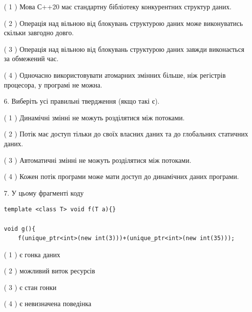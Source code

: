 \documentclass[12pt, ukrainian]{article}
\begin{document}
\begin {large}
{( 1 ) Мова С++20 має стандартну бібліотеку конкурентних структур даних.%

( 2 ) Операція над вільною від блокувань структурою даних може виконуватись скільки завгодно довго.%

( 3 ) Операція над вільною від блокувань структурою даних завжди виконається за обмежений час.%

( 4 ) Одночасно використовувати атомарних змінних більше, ніж регістрів процесора, у програмі не можна.%
\newpage



\vspace{5mm}
6. Виберіть усі правильні твердження (якщо такі є).\par
\vspace{2mm}

( 1 ) Динамічні змінні не можуть розділятися між потоками.%

( 2 ) Потік має доступ тільки до своїх власних даних та до глобальних статичних даних.%

( 3 ) Автоматичні змінні не можуть розділятися між потоками.%

( 4 ) Кожен потік програми може мати доступ до динамічних даних програми.%


\vspace{5mm}
7. У цьому фрагменті коду
\begin{verbatim}
template <class T> void f(T a){}

void g(){
    f(unique_ptr<int>(new int(3)))+(unique_ptr<int>(new int(35)));
\end{verbatim}

( 1 ) є гонка даних%

( 2 ) можливий виток ресурсів%

( 3 ) є стан гонки%

( 4 ) є невизначена поведінка%
}
\end {large}
\end{document}

